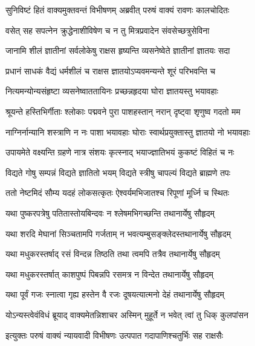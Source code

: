 
\twolineshloka
{सुनिविष्टं हितं वाक्यमुक्तवन्तं विभीषणम्}
{अब्रवीत् परुषं वाक्यं रावणः कालचोदितः} %

\twolineshloka
{वसेत् सह सपत्नेन क्रुद्धेनाशीविषेण च}
{न तु मित्रप्रवादेन संवसेच्छत्रुसेविना} %

\twolineshloka
{जानामि शीलं ज्ञातीनां सर्वलोकेषु राक्षस}
{हृष्यन्ति व्यसनेष्वेते ज्ञातीनां ज्ञातयः सदा} %

\twolineshloka
{प्रधानं साधकं वैद्यं धर्मशीलं च राक्षस}
{ज्ञातयोऽप्यवमन्यन्ते शूरं परिभवन्ति च} %

\twolineshloka
{नित्यमन्योन्यसंहृष्टा व्यसनेष्वाततायिनः}
{प्रच्छन्नहृदया घोरा ज्ञातयस्तु भयावहाः} %

\twolineshloka
{श्रूयन्ते हस्तिभिर्गीताः श्लोकाः पद्मवने पुरा}
{पाशहस्तान् नरान् दृष्ट्वा शृणुष्व गदतो मम} %

\twolineshloka
{नाग्निर्नान्यानि शस्त्राणि न नः पाशा भयावहाः}
{घोराः स्वार्थप्रयुक्तास्तु ज्ञातयो नो भयावहाः} %

\twolineshloka
{उपायमेते वक्ष्यन्ति ग्रहणे नात्र संशयः}
{कृत्स्नाद् भयाज्ज्ञातिभयं कुकष्टं विहितं च नः} %

\twolineshloka
{विद्यते गोषु सम्पन्नं विद्यते ज्ञातितो भयम्}
{विद्यते स्त्रीषु चापल्यं विद्यते ब्राह्मणे तपः} %

\twolineshloka
{ततो नेष्टमिदं सौम्य यदहं लोकसत्कृतः}
{ऐश्वर्यमभिजातश्च रिपूणां मूर्ध्नि च स्थितः} %

\twolineshloka
{यथा पुष्करपत्रेषु पतितास्तोयबिन्दवः}
{न श्लेषमभिगच्छन्ति तथानार्येषु सौहृदम्} %

\twolineshloka
{यथा शरदि मेघानां सिञ्चतामपि गर्जताम्}
{न भवत्यम्बुसङ्क्लेदस्तथानार्येषु सौहृदम्} %

\twolineshloka
{यथा मधुकरस्तर्षाद् रसं विन्दन्न तिष्ठति}
{तथा त्वमपि तत्रैव तथानार्येषु सौहृदम्} %

\twolineshloka
{यथा मधुकरस्तर्षात् काशपुष्पं पिबन्नपि}
{रसमत्र न विन्देत तथानार्येषु सौहृदम्} %

\twolineshloka
{यथा पूर्वं गजः स्नात्वा गृह्य हस्तेन वै रजः}
{दूषयत्यात्मनो देहं तथानार्येषु सौहृदम्} %

\twolineshloka
{योऽन्यस्त्वेवंविधं ब्रूयाद् वाक्यमेतन्निशाचर}
{अस्मिन् मुहूर्ते न भवेत् त्वां तु धिक् कुलपांसन} %

\twolineshloka
{इत्युक्तः परुषं वाक्यं न्यायवादी विभीषणः}
{उत्पपात गदापाणिश्चतुर्भिः सह राक्षसैः} %

